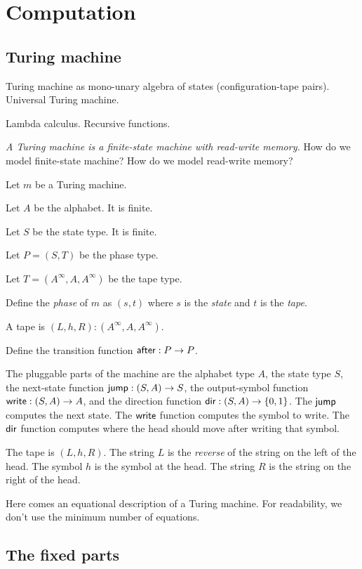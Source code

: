 \chapter{Computation}

\section{Turing machine}

Turing machine as mono-unary algebra of states (configuration-tape pairs).
Universal Turing machine.

Lambda calculus.
Recursive functions.

\emph{A Turing machine is a finite-state machine with read-write memory.}
How do we model finite-state machine?
How do we model read-write memory?

Let \(m\) be a Turing machine.

Let \(A\) be the alphabet.
It is finite.

Let \(S\) be the state type.
It is finite.

Let \(P = (S,T)\) be the phase type.

Let \(T = (A^\infty,A,A^\infty)\) be the tape type.

Define the \emph{phase} of \(m\) as \((s,t)\)
where \(s\) is the \emph{state} and \(t\) is the \emph{tape}.

A tape is \((L,h,R) : (A^\infty,A,A^\infty)\).

Define the transition function \(\textsf{after} : P \to P\).

The pluggable parts of the machine are
the alphabet type \(A\),
the state type \(S\),
the next-state function \(\textsf{jump} : (S,A) \to S\),
the output-symbol function \(\textsf{write} : (S,A) \to A\),
and the direction function \(\textsf{dir} : (S,A) \to \{0,1\}\).
The \(\textsf{jump}\) computes the next state.
The \(\textsf{write}\) function computes the symbol to write.
The \(\textsf{dir}\) function computes where the head should move after writing that symbol.

The tape is \((L,h,R)\).
The string \(L\) is the \emph{reverse} of the string on the left of the head.
The symbol \(h\) is the symbol at the head.
The string \(R\) is the string on the right of the head.

Here comes an equational description of a Turing machine.
For readability, we don't use the minimum number of equations.

\section{The fixed parts}

